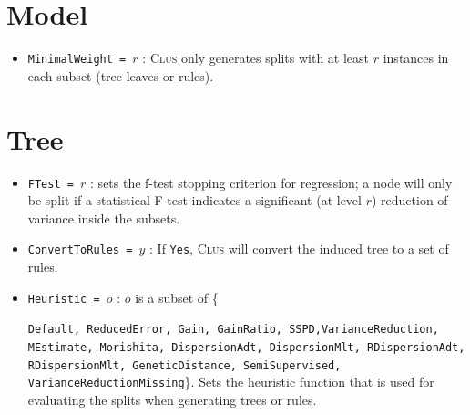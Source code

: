 \documentclass[a4paper]{report}
\newcommand{\clus}{\textsc{Clus}}
\begin{document}
\section{Model}

\begin{itemize}
\item {\tt MinimalWeight = $r$} : \clus{} only generates splits with at least $r$ instances in each subset (tree leaves or rules).
\end{itemize}

\section{Tree}

\begin{itemize}
	\item {\tt FTest = $r$} : sets the f-test stopping criterion for regression; a node will only be split if a statistical F-test indicates a significant (at level $r$) reduction of variance inside the subsets.
	\item {\tt ConvertToRules = $y$} : If {\tt Yes},  \clus{} will convert the induced tree to a set of rules.
	\item \texttt{Heuristic = $o$} : $o$ is a subset of \{\raggedright\texttt{Default, ReducedError, Gain, GainRatio, SSPD,\newline VarianceReduction, MEstimate, Morishita, DispersionAdt, DispersionMlt, RDispersionAdt, RDispersionMlt, GeneticDistance, SemiSupervised, VarianceReductionMissing}\}. Sets the heuristic function that is used for evaluating the splits when generating trees or rules.
	

\end{itemize}
\end{document}

